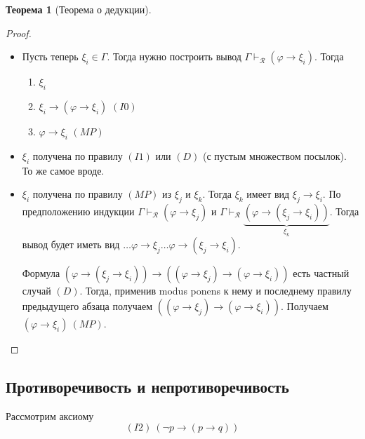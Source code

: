 \documentclass[12pt]{article}
\let\im\rightarrow
\let\n\neg
\theoremstyle{definition}
\newtheorem{theorem}{Теорема}[section]
\theoremstyle{statement}
\theoremstyle{theorem}
\begin{document}
\begin{theorem}[Теорема о дедукции]
\begin{proof}
\begin{itemize}
      \item Пусть теперь $\xi_i \in \Gamma$. Тогда нужно построить
        вывод $\Gamma \vdash_{\mathcal{R}} (\varphi \im \xi_i)$. Тогда
        \begin{enumerate}
          \item $\xi_i$

          \item $\xi_i \im (\varphi \im \xi_i)$ $(I0)$

          \item $\varphi \im \xi_i$ $(MP)$
        \end{enumerate}

      \item $\xi_i$ получена по правилу $(I1)$ или $(D)$ (с пустым
        множеством посылок). То же самое вроде.

      \item $\xi_i$ получена по правилу $(MP)$ из $\xi_j$ и $\xi_k$.
        Тогда $\xi_k$ имеет вид $\xi_j \im \xi_i$. По предположению
        индукции $\Gamma \vdash_{\mathcal{R}} (\varphi \im \xi_j)$ и
        $\Gamma \vdash_{\mathcal{R}} \underbrace{(\varphi \im (\xi_j
        \im \xi_i))}_{\xi_k}$. Тогда вывод будет иметь вид $\dots
        \varphi \im \xi_j \dots \varphi \im (\xi_j \im \xi_i)$.

        Формула $(\varphi \im (\xi_j \im \xi_i)) \im ((\varphi \im
        \xi_j) \im (\varphi \im \xi_i))$ есть частный случай $(D)$.
        Тогда, применив modus ponens к нему и последнему правилу
        предыдущего абзаца получаем $((\varphi \im \xi_j) \im
        (\varphi \im \xi_i))$. Получаем $(\varphi \im \xi_i)\ (MP)$.
    \end{itemize}
  \end{proof}
\end{theorem}

\subsection{Противоречивость и непротиворечивость}

Рассмотрим аксиому
\begin{displaymath}
  (I2)\ (\n p \im (p \im q))
\end{displaymath}
\end{document}
